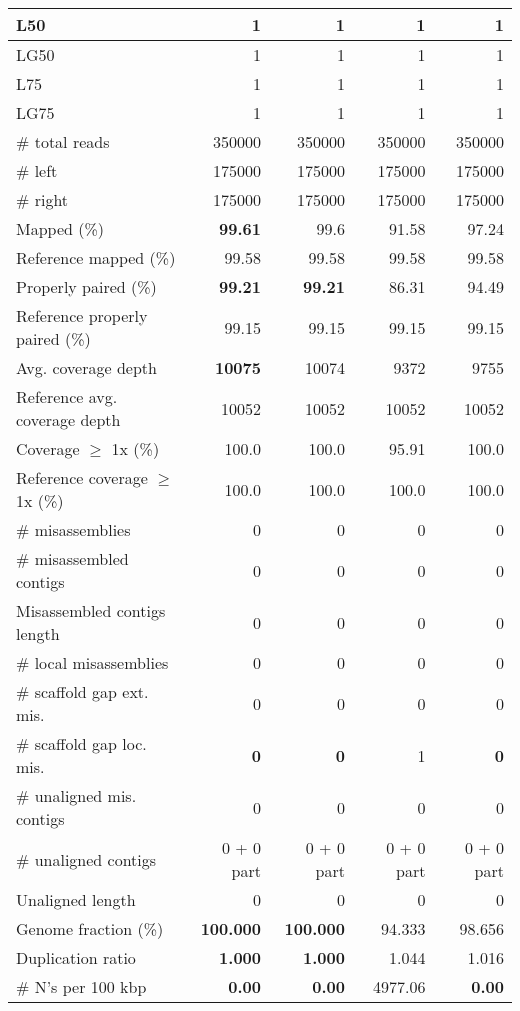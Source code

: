 \documentclass[12pt,a4paper]{article}
\begin{document}
\begin{table}[ht]
\begin{center}
\begin{tabular}{|l*{4}{|r}|}
L50 & 1 & 1 & 1 & 1 \\ \hline
LG50 & 1 & 1 & 1 & 1 \\ \hline
L75 & 1 & 1 & 1 & 1 \\ \hline
LG75 & 1 & 1 & 1 & 1 \\ \hline
\# total reads & 350000 & 350000 & 350000 & 350000 \\ \hline
\# left & 175000 & 175000 & 175000 & 175000 \\ \hline
\# right & 175000 & 175000 & 175000 & 175000 \\ \hline
Mapped (\%) & {\bf 99.61} & 99.6 & 91.58 & 97.24 \\ \hline
Reference mapped (\%) & 99.58 & 99.58 & 99.58 & 99.58 \\ \hline
Properly paired (\%) & {\bf 99.21} & {\bf 99.21} & 86.31 & 94.49 \\ \hline
Reference properly paired (\%) & 99.15 & 99.15 & 99.15 & 99.15 \\ \hline
Avg. coverage depth & {\bf 10075} & 10074 & 9372 & 9755 \\ \hline
Reference avg. coverage depth & 10052 & 10052 & 10052 & 10052 \\ \hline
Coverage $\geq$ 1x (\%) & 100.0 & 100.0 & 95.91 & 100.0 \\ \hline
Reference coverage $\geq$ 1x (\%) & 100.0 & 100.0 & 100.0 & 100.0 \\ \hline
\# misassemblies & 0 & 0 & 0 & 0 \\ \hline
\# misassembled contigs & 0 & 0 & 0 & 0 \\ \hline
Misassembled contigs length & 0 & 0 & 0 & 0 \\ \hline
\# local misassemblies & 0 & 0 & 0 & 0 \\ \hline
\# scaffold gap ext. mis. & 0 & 0 & 0 & 0 \\ \hline
\# scaffold gap loc. mis. & {\bf 0} & {\bf 0} & 1 & {\bf 0} \\ \hline
\# unaligned mis. contigs & 0 & 0 & 0 & 0 \\ \hline
\# unaligned contigs & 0 + 0 part & 0 + 0 part & 0 + 0 part & 0 + 0 part \\ \hline
Unaligned length & 0 & 0 & 0 & 0 \\ \hline
Genome fraction (\%) & {\bf 100.000} & {\bf 100.000} & 94.333 & 98.656 \\ \hline
Duplication ratio & {\bf 1.000} & {\bf 1.000} & 1.044 & 1.016 \\ \hline
\# N's per 100 kbp & {\bf 0.00} & {\bf 0.00} & 4977.06 & {\bf 0.00} \\ \hline

\end{tabular}
\end{center}
\end{table}
\end{document}
